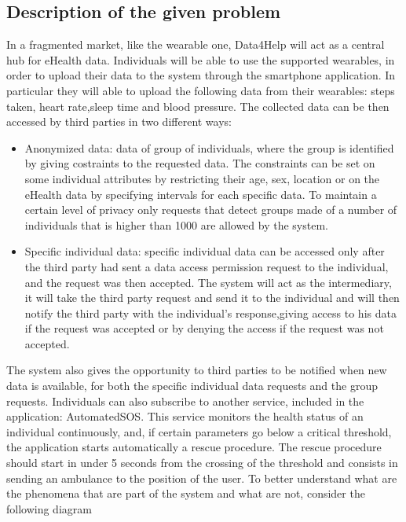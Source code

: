 \subsection{Description of the given problem}
In a fragmented market, like the wearable one, Data4Help will act as a central hub for eHealth data.
Individuals will be able to use the supported wearables, in order to upload their data to the system through the smartphone application. In particular they will able to upload the following data from their wearables: steps taken, heart rate,sleep time and blood pressure.
\givespace
The collected data can be then accessed by third parties in two different ways:
\begin{itemize}
\item Anonymized data: data of group of individuals, where the group is identified by giving costraints to the requested data. The constraints can be set on some individual attributes by restricting their age, sex, location or on the eHealth data by specifying intervals for each specific data. To maintain a certain level of privacy only requests that detect groups made of a number of individuals that is higher than 1000 are allowed by the system.
\item Specific individual data: specific individual data can be accessed only after the third party had sent a data access permission request to the individual, and the request was then accepted. The system will act as the intermediary, it will take the third party request and send it to the individual and will then notify the third party with the individual's response,giving access to his data if the request was accepted or by denying the access if the request was not accepted.
\end{itemize}
The system also gives the opportunity to third parties to be notified when new data is available, for both the specific individual data requests and the group requests.
\givespace
Individuals can also subscribe to another service, included in the application: AutomatedSOS. This service monitors the health status of an individual continuously, and, if certain parameters go below a critical threshold, the application starts automatically a rescue procedure. The rescue procedure should start in under 5 seconds from the crossing of the threshold and consists in sending an ambulance to the position of the user.
\givespace
To better understand what are the phenomena that are part of the system and what are not, consider the following diagram
